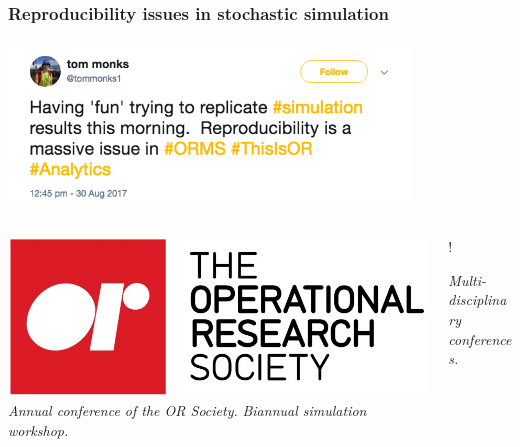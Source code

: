 \documentclass{beamer}
\begin{document}
\begin{frame}
  \frametitle{Reproducibility issues in stochastic simulation}
  \begin{center}
    \includegraphics[width=0.8\textwidth]{reproducibility_tweet}
  \end{center}
\end{frame}

\begin{frame}
  \begin{columns}
    \begin{column}{0.6\textwidth}
      \begin{center}
          \includegraphics[width=\textwidth]{theorsociety}
          \textit{Annual conference of the OR Society.}
          \textit{Biannual simulation workshop.}
        \end{center}
    \end{column}
    \begin{column}{0.4\textwidth}
      \begin{center}
        \resizebox {\columnwidth} {!} {
        }
        \textit{Multi-disciplinary conferences.}
      \end{center}
    \end{column}
  \end{columns}
\end{frame}
\end{document}

